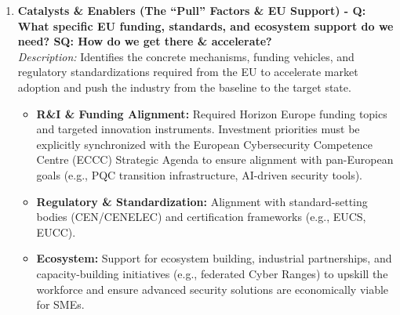 \documentclass[12pt,a4paper]{article}
\begin{document}
\begin{enumerate}
    \item \textbf{Catalysts \& Enablers (The ``Pull'' Factors \& EU Support) - Q: What specific EU funding, standards, and ecosystem support do we need? SQ: How do we get there \& accelerate?}\\
    \textit{Description:} Identifies the concrete mechanisms, funding vehicles, and regulatory standardizations required from the EU to accelerate market adoption and push the industry from the baseline to the target state.
    \begin{itemize}
        \item \textbf{R\&I \& Funding Alignment:} Required Horizon Europe funding topics and targeted innovation instruments. Investment priorities must be explicitly synchronized with the European Cybersecurity Competence Centre (ECCC) Strategic Agenda \cite{eccc} to ensure alignment with pan-European goals (e.g., PQC transition infrastructure, AI-driven security tools).
        \item \textbf{Regulatory \& Standardization:} Alignment with standard-setting bodies (CEN/CENELEC) and certification frameworks (e.g., EUCS, EUCC).
        \item \textbf{Ecosystem:} Support for ecosystem building, industrial partnerships, and capacity-building initiatives (e.g., federated Cyber Ranges) to upskill the workforce and ensure advanced security solutions are economically viable for SMEs.
    \end{itemize}


\end{enumerate}
\end{document}
